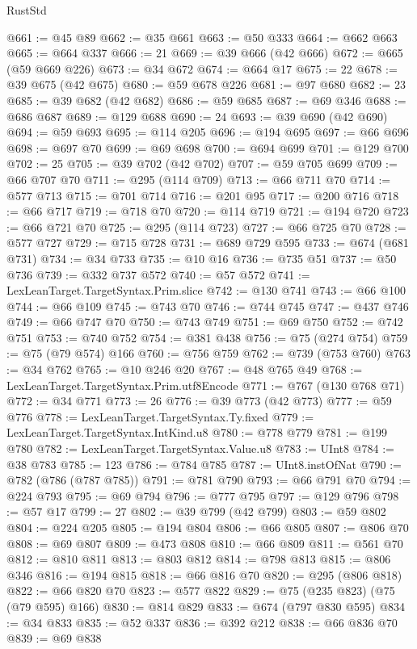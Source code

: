 \begin{lexlean}{RustStd}
\begin{coremodule}
@661 := @45 @89
@662 := @35 @661
@663 := @50 @333
@664 := @662 @663
@665 := @664 @337
@666 := 21
@669 := @39 @666 (@42 @666)
@672 := @665 (@59 @669 @226)
@673 := @34 @672
@674 := @664 @17
@675 := 22
@678 := @39 @675 (@42 @675)
@680 := @59 @678 @226
@681 := @97 @680
@682 := 23
@685 := @39 @682 (@42 @682)
@686 := @59 @685
@687 := @69 @346
@688 := @686 @687
@689 := @129 @688
@690 := 24
@693 := @39 @690 (@42 @690)
@694 := @59 @693
@695 := @114 @205
@696 := @194 @695
@697 := @66 @696
@698 := @697 @70
@699 := @69 @698
@700 := @694 @699
@701 := @129 @700
@702 := 25
@705 := @39 @702 (@42 @702)
@707 := @59 @705 @699
@709 := @66 @707 @70
@711 := @295 (@114 @709)
@713 := @66 @711 @70
@714 := @577 @713
@715 := @701 @714
@716 := @201 @95
@717 := @200 @716
@718 := @66 @717
@719 := @718 @70
@720 := @114 @719
@721 := @194 @720
@723 := @66 @721 @70
@725 := @295 (@114 @723)
@727 := @66 @725 @70
@728 := @577 @727
@729 := @715 @728
@731 := @689 @729 @595
@733 := @674 (@681 @731)
@734 := @34 @733
@735 := @10 @16
@736 := @735 @51
@737 := @50 @736
@739 := @332 @737 @572
@740 := @57 @572
@741 := LexLeanTarget.TargetSyntax.Prim.slice
@742 := @130 @741
@743 := @66 @100
@744 := @66 @109
@745 := @743 @70
@746 := @744 @745
@747 := @437 @746
@749 := @66 @747 @70
@750 := @743 @749
@751 := @69 @750
@752 := @742 @751
@753 := @740 @752
@754 := @381 @438
@756 := @75 (@274 @754)
@759 := @75 (@79 @574) @166
@760 := @756 @759
@762 := @739 (@753 @760)
@763 := @34 @762
@765 := @10 @246 @20
@767 := @48 @765 @49
@768 := LexLeanTarget.TargetSyntax.Prim.utf8Encode
@771 := @767 (@130 @768 @71)
@772 := @34 @771
@773 := 26
@776 := @39 @773 (@42 @773)
@777 := @59 @776
@778 := LexLeanTarget.TargetSyntax.Ty.fixed
@779 := LexLeanTarget.TargetSyntax.IntKind.u8
@780 := @778 @779
@781 := @199 @780
@782 := LexLeanTarget.TargetSyntax.Value.u8
@783 := UInt8
@784 := @38 @783
@785 := 123
@786 := @784 @785
@787 := UInt8.instOfNat
@790 := @782 (@786 (@787 @785))
@791 := @781 @790
@793 := @66 @791 @70
@794 := @224 @793
@795 := @69 @794
@796 := @777 @795
@797 := @129 @796
@798 := @57 @17
@799 := 27
@802 := @39 @799 (@42 @799)
@803 := @59 @802
@804 := @224 @205
@805 := @194 @804
@806 := @66 @805
@807 := @806 @70
@808 := @69 @807
@809 := @473 @808
@810 := @66 @809
@811 := @561 @70
@812 := @810 @811
@813 := @803 @812
@814 := @798 @813
@815 := @806 @346
@816 := @194 @815
@818 := @66 @816 @70
@820 := @295 (@806 @818)
@822 := @66 @820 @70
@823 := @577 @822
@829 := @75 (@235 @823) (@75 (@79 @595) @166)
@830 := @814 @829
@833 := @674 (@797 @830 @595)
@834 := @34 @833
@835 := @52 @337
@836 := @392 @212
@838 := @66 @836 @70
@839 := @69 @838

\end{coremodule}
\end{lexlean}
